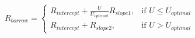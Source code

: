 \documentclass[preview]{standalone}
\begin{document}
\begin{align*}
R_{borrow} = \begin{cases} R_{intercept} + \frac{ U }{ U _{optimal}}R_{slope1}, & \text{if }  U  \leq  U _{optimal} &\\R_{intercept} + R_{slope2}, & \text{if }  U  >  U _{optimal} \end{cases}
\end{align*}
\end{document}

